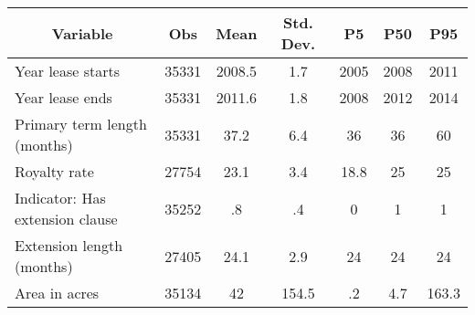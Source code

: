 \begin{tabular}{l c c c  c c c}\hline\hline
\multicolumn{1}{c}{Variable} & Obs & Mean & Std. Dev.
  & P5 & P50 & P95  \\ \hline
Year lease starts & 35331 & 2008.5 & 1.7  & 2005 & 2008 & 2011 \\
Year lease ends & 35331 & 2011.6 & 1.8  & 2008 & 2012 & 2014 \\
Primary term length (months) & 35331 & 37.2 & 6.4  & 36 & 36 & 60 \\
Royalty rate & 27754 & 23.1 & 3.4  & 18.8 & 25 & 25 \\
Indicator: Has extension clause & 35252 & .8 & .4  & 0 & 1 & 1 \\
Extension length (months) & 27405 & 24.1 & 2.9  & 24 & 24 & 24 \\
Area in acres & 35134 & 42 & 154.5  & .2 & 4.7 & 163.3 \\
\hline\end{tabular}
